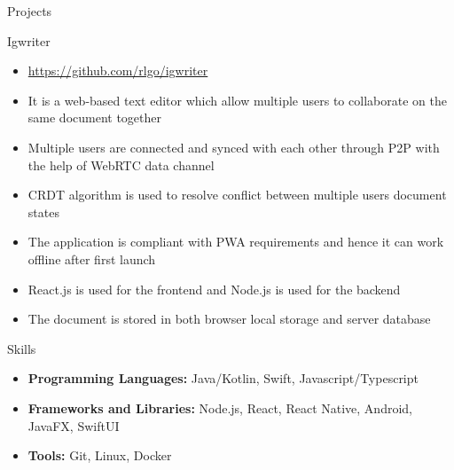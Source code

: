 \documentclass[]{mcdowellcv}
\begin{document}
\begin{cvsection}{Projects}
	\begin{cvsubsection}{Igwriter}{}{}
		\begin{itemize}
			\item \url{https://github.com/rlgo/igwriter}
			\item It is a web-based text editor which allow multiple users to collaborate on the same document together
			\item Multiple users are connected and synced with each other through P2P with the help of WebRTC data channel
			\item CRDT algorithm is used to resolve conflict between multiple users document states
			\item The application is compliant with PWA requirements and hence it can work offline after first launch
			\item React.js is used for the frontend and Node.js is used for the backend
			\item The document is stored in both browser local storage and server database
		\end{itemize}
	\end{cvsubsection}
\end{cvsection}
\begin{cvsection}{Skills}
	\begin{cvsubsection}{}{}{}
		\begin{itemize}
			\item \textbf{Programming Languages:}  Java/Kotlin, Swift, Javascript/Typescript
			\item \textbf{Frameworks and Libraries:}  Node.js, React, React Native, Android, JavaFX, SwiftUI
			\item \textbf{Tools:}  Git, Linux, Docker
		\end{itemize}
	\end{cvsubsection}
\end{cvsection}
\end{document}
